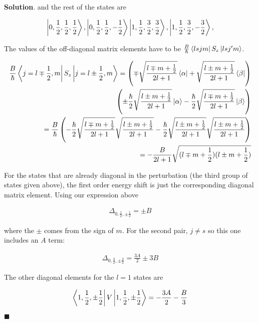 \documentclass[12pt]{article}
\theoremstyle{definition}
\newenvironment{s}{%
        \begin{trivlist} \item \textbf{Solution}. }{%
            \hspace*{\fill} $\blacksquare$\end{trivlist}}%
\begin{document}
{\begin{s}
and the rest of the states are

\begin{align*}
\ket{0, \frac{1}{2}, \frac{1}{2}, \frac{1}{2}},
\ket{0, \frac{1}{2}, \frac{1}{2}, -\frac{1}{2}}
\ket{1, \frac{1}{2}, \frac{3}{2}, \frac{3}{2}},
\ket{1, \frac{1}{2}, \frac{3}{2}, -\frac{3}{2}},
\end{align*}

The values of the off-diagonal matrix elements have to be $\frac{B}{\hbar}\bra{lsjm}S_z\ket{lsj'm}$.

\begin{align*}
\frac{B}{\hbar}\bra{j=l\mp \frac{1}{2},m}S_z\ket{j=l\pm \frac{1}{2},m} = \left(\mp\sqrt{\frac{l\mp m +\frac{1}{2}}{2l+1}}\bra{\alpha} 
+ \sqrt{\frac{l\pm m +\frac{1}{2}}{2l+1}}\bra{\beta}\right)\\
\left(\pm\frac{\hbar}{2}\sqrt{\frac{l\pm m +\frac{1}{2}}{2l+1}}\ket{\alpha} 
- \frac{\hbar}{2}\sqrt{\frac{l\mp m +\frac{1}{2}}{2l+1}}\ket{\beta}\right)\\
= \frac{B}{\hbar}\left(-\frac{\hbar}{2}\sqrt{\frac{l\mp m +\frac{1}{2}}{2l+1}}\sqrt{\frac{l\pm m +\frac{1}{2}}{2l+1}} - \frac{\hbar}{2}\sqrt{\frac{l\pm m +\frac{1}{2}}{2l+1}}\sqrt{\frac{l\pm m +\frac{1}{2}}{2l+1}}\right)\\
= -\frac{B}{2l+1}\sqrt{(l\mp m +\frac{1}{2})(l\pm m +\frac{1}{2})}
\end{align*} 

For the states that are already diagonal in the perturbation (the third group of states given above), the first order energy shift is just the corresponding diagonal matrix element. Using our expression above 

\begin{align*}
\Delta_{0,\frac{1}{2},\pm\frac{1}{2}} = \pm B
\end{align*}

where the $\pm$ comes from the sign of $m$. For the second pair, $j\neq s$ so this one includes an $A$ term:

\begin{align*}
\Delta_{0,\frac{3}{2},\pm\frac{3}{2}} = \frac{3A}{2} \pm 3B
\end{align*}

The other diagonal elements for the $l=1$ states are

\begin{align*}
\bra{1,\frac{1}{2},\pm\frac{1}{2}}V\ket{1,\frac{1}{2},\pm\frac{1}{2}} = -\frac{3A}{2} - \frac{B}{3}
\end{align*}


\end{s}}
\end{document}
